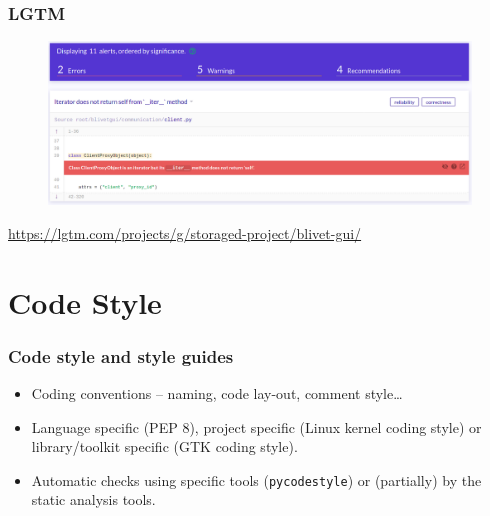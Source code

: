 \documentclass[aspectratio=169]{beamer}
\begin{document}
\begin{frame}
	\frametitle{LGTM}

\begin{figure}[ht!]
	\begin{center}
  	  \includegraphics[width=\textwidth]{img/lgtm.png}
	\end{center}
\end{figure}

\small\url{https://lgtm.com/projects/g/storaged-project/blivet-gui/}

\end{frame}

\section{Code Style}

\begin{frame}
	\frametitle{Code style and style guides}

	\begin{block}{}
		\begin{itemize}
			\item Coding conventions -- naming, code lay-out, comment style…
			\item Language specific (PEP 8\footnotemark), project specific (Linux kernel coding style\footnotemark) or library/toolkit specific (GTK coding style\footnotemark).
			\item Automatic checks using specific tools (\texttt{pycodestyle}) or (partially) by the static analysis tools.
		\end{itemize}
	\end{block}

\end{frame}
\end{document}

